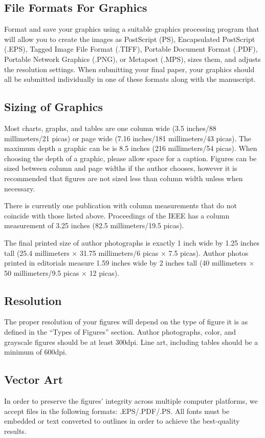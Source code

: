 \documentclass{ieeeaccess}
\begin{document}
\subsection{File Formats For Graphics}\label{formats}
Format and save your graphics using a suitable graphics processing program 
that will allow you to create the images as PostScript (PS), Encapsulated 
PostScript (.EPS), Tagged Image File Format (.TIFF), Portable Document 
Format (.PDF), Portable Network Graphics (.PNG), or Metapost (.MPS), sizes them, and adjusts 
the resolution settings. When 
submitting your final paper, your graphics should all be submitted 
individually in one of these formats along with the manuscript.

\subsection{Sizing of Graphics}
Most charts, graphs, and tables are one column wide (3.5 inches/88 
millimeters/21 picas) or page wide (7.16 inches/181 millimeters/43 
picas). The maximum depth a graphic can be is 8.5 inches (216 millimeters/54
picas). When choosing the depth of a graphic, please allow space for a 
caption. Figures can be sized between column and page widths if the author 
chooses, however it is recommended that figures are not sized less than 
column width unless when necessary. 

There is currently one publication with column measurements that do not 
coincide with those listed above. Proceedings of the IEEE has a column 
measurement of 3.25 inches (82.5 millimeters/19.5 picas). 

The final printed size of author photographs is exactly
1 inch wide by 1.25 inches tall (25.4 millimeters$\,\times\,$31.75 millimeters/6 
picas$\,\times\,$7.5 picas). Author photos printed in editorials measure 1.59 inches 
wide by 2 inches tall (40 millimeters$\,\times\,$50 millimeters/9.5 picas$\,\times\,$12 
picas).

\subsection{Resolution }
The proper resolution of your figures will depend on the type of figure it 
is as defined in the ``Types of Figures'' section. Author photographs, 
color, and grayscale figures should be at least 300dpi. Line art, including 
tables should be a minimum of 600dpi.

\subsection{Vector Art}
In order to preserve the figures' integrity across multiple computer 
platforms, we accept files in the following formats: .EPS/.PDF/.PS. All 
fonts must be embedded or text converted to outlines in order to achieve the 
best-quality results.
\end{document}
